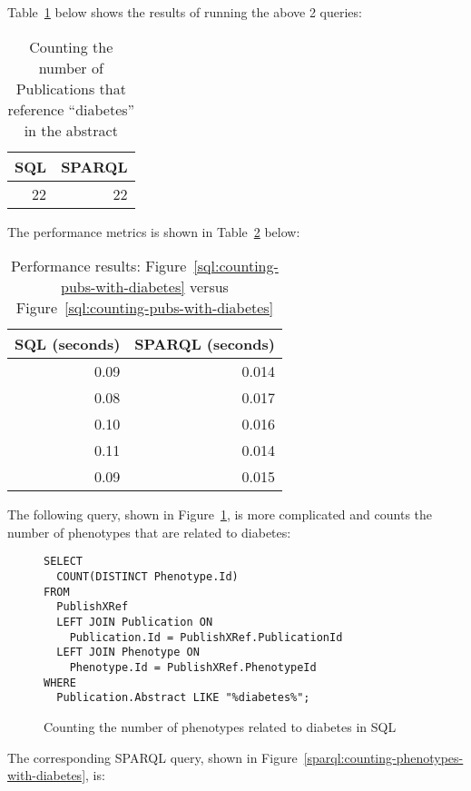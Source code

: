 Table~\ref{table:count-diabetes-publications} below shows the results of running the above 2 queries:

\begin{table}[H]
\begin{tabular}{rr}
SQL & SPARQL \\[0pt]
\toprule
22 & 22\\[0pt]
\end{tabular}
\caption{Counting the number of Publications that reference ``diabetes'' in the abstract}\label{table:count-diabetes-publications}
\end{table}

The performance metrics is shown in Table~\ref{table:perf-1} below:

\begin{table}[H]
\begin{tabular}{rr}
SQL (seconds) & SPARQL (seconds)\\[0pt]
\toprule
0.09 & 0.014\\[0pt]
0.08 & 0.017\\[0pt]
0.10 & 0.016\\[0pt]
0.11 & 0.014\\[0pt]
0.09 & 0.015\\[0pt]
\end{tabular}
\caption{Performance results: Figure~\ref{sql:counting-pubs-with-diabetes} versus Figure~\ref{sql:counting-pubs-with-diabetes} }\label{table:perf-1}
\end{table}

The following query, shown in Figure~\ref{sql:counting-phenotypes-with-diabetes}, is more complicated and counts the number of phenotypes that are related to diabetes:

\begin{figure}[H]
\centering
\begin{verbatim}
SELECT
  COUNT(DISTINCT Phenotype.Id)
FROM
  PublishXRef
  LEFT JOIN Publication ON
    Publication.Id = PublishXRef.PublicationId 
  LEFT JOIN Phenotype ON
    Phenotype.Id = PublishXRef.PhenotypeId
WHERE
  Publication.Abstract LIKE "%diabetes%";
\end{verbatim}
\caption{Counting the number of phenotypes related to diabetes in SQL}\label{sql:counting-phenotypes-with-diabetes}
\end{figure}

The corresponding SPARQL query, shown in Figure~\ref{sparql:counting-phenotypes-with-diabetes}, is:

